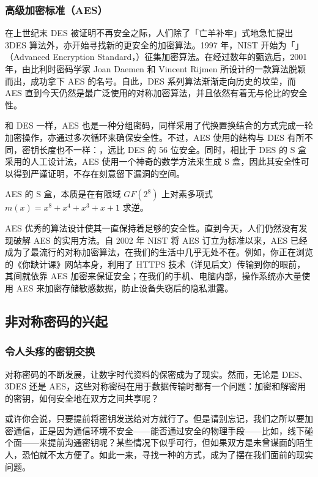 \subsubsection{高级加密标准（AES）}

在上世纪末 DES 被证明不再安全之际，人们除了「亡羊补牢」式地急忙提出 3DES 算法外，亦开始寻找新的更安全的加密算法。1997 年，NIST 开始为「」（Advanced Encryption Standard，）征集加密算法。在经过数年的甄选后，2001 年，由比利时密码学家 Joan Daemen 和 Vincent Rijmen 所设计的一款算法脱颖而出，成功拿下 AES 的名号。自此，DES 系列算法渐渐走向历史的坟茔，而 AES 直到今天仍然是最广泛使用的对称加密算法，并且依然有着无与伦比的安全性。

和 DES 一样，AES 也是一种分组密码，同样采用了代换置换结合的方式完成一轮加密操作，亦通过多次循环来确保安全性。不过，AES 使用的结构与 DES 有所不同，密钥长度也不一样：，远比 DES 的 56 位安全。同时，相比于 DES 的 S 盒采用的人工设计法，AES 使用一个神奇的数学方法来生成 S 盒，因此其安全性可以得到严谨证明，不存在刻意留下漏洞的空间。

\begin{note}
  AES 的 S 盒，本质是在有限域 $GF(2^8)$ 上对素多项式 $m(x) = x^8 + x^4 + x^3 + x + 1$ 求逆。
\end{note}

AES 优秀的算法设计使其一直保持着足够的安全性。直到今天，人们仍然没有发现破解 AES 的实用方法。自 2002 年 NIST 将 AES 订立为标准以来，AES 已经成为了最流行的对称加密算法，在我们的生活中几乎无处不在。例如，你正在浏览的《你缺计课》网站本身，利用了 HTTPS 技术（详见后文）传输到你的眼前，其间就依靠 AES 加密来保证安全；在我们的手机、电脑内部，操作系统亦大量使用 AES 来加密存储敏感数据，防止设备失窃后的隐私泄露。

\subsection{非对称密码的兴起}

\subsubsection{令人头疼的密钥交换}

对称密码的不断发展，让数字时代资料的保密成为了现实。然而，无论是 DES、3DES 还是 AES，这些对称密码在用于数据传输时都有一个问题：加密和解密用的密钥，如何安全地在双方之间共享呢？

或许你会说，只要提前将密钥发送给对方就行了。但是请别忘记，我们之所以要加密通信，正是因为通信环境不安全——能否通过安全的物理手段——比如，线下碰个面——来提前沟通密钥呢？某些情况下似乎可行，但如果双方是未曾谋面的陌生人，恐怕就不太方便了。如此一来，寻找一种的方式，成为了摆在我们面前的现实问题。

